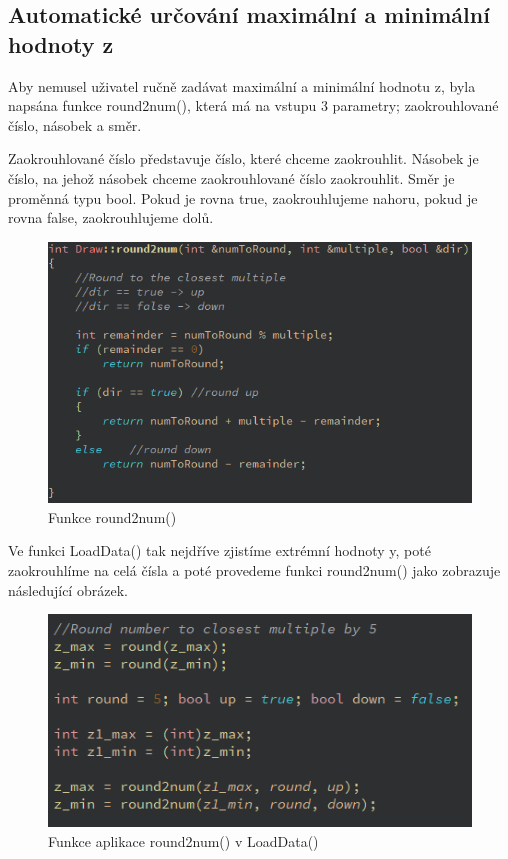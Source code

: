 \documentclass[11pt]{article}
\begin{document}
\clearpage

\subsection{Automatické určování maximální a minimální hodnoty z}
Aby nemusel uživatel ručně zadávat maximální a minimální hodnotu z, byla napsána funkce round2num(), která má na vstupu 3 parametry; zaokrouhlované číslo, násobek a směr.

Zaokrouhlované číslo představuje číslo, které chceme zaokrouhlit. Násobek je číslo, na jehož násobek chceme zaokrouhlované číslo zaokrouhlit. Směr je proměnná typu bool. Pokud je rovna true, zaokrouhlujeme nahoru, pokud je rovna false, zaokrouhlujeme dolů.

\begin{figure}[htbh]
	\centering
	\includegraphics[scale=0.7]{images/round2num.png} 
	\caption{Funkce round2num()}
	\label{fig:round2num}
\end{figure} 

Ve funkci LoadData() tak nejdříve zjistíme extrémní hodnoty y, poté zaokrouhlíme na celá čísla a poté provedeme funkci round2num() jako zobrazuje následující obrázek.

\begin{figure}[htbh]
	\centering
	\includegraphics[scale=0.7]{images/round2num2.png} 
	\caption{Funkce aplikace round2num() v LoadData()}
	\label{fig:round2num2}
\end{figure} 
\end{document}
